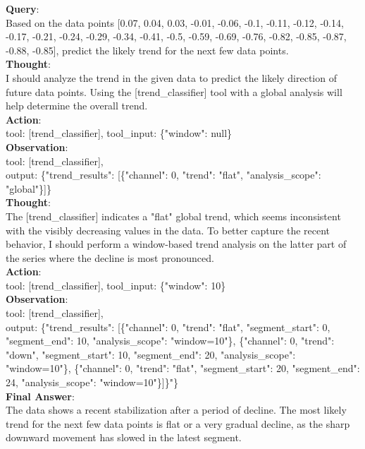 \clearpage
\begin{tcolorbox}[
  colback=white,
  colframe=black!50,
  boxrule=0.3mm,
  width=\textwidth,
  rounded corners,
  title=Sample 4: Trend Prediction,
  fonttitle=\bfseries,
  left=2mm, right=2mm, top=2mm, bottom=2mm
]
\textbf{Query}:\\
Based on the data points [0.07, 0.04, 0.03, -0.01, -0.06, -0.1, -0.11, -0.12, -0.14, -0.17, -0.21, -0.24, -0.29, -0.34, -0.41, -0.5, -0.59, -0.69, -0.76, -0.82, -0.85, -0.87, -0.88, -0.85], predict the likely trend for the next few data points. \\

\textbf{Thought}:\\
I should analyze the trend in the given data to predict the likely direction of future data points. Using the [trend\_classifier] tool with a global analysis will help determine the overall trend.\\

\textbf{Action}:\\
tool: [trend\_classifier], tool\_input: \{"window": null\} \\

\textbf{Observation}: \\
tool: [trend\_classifier], 
\\
output: \{"trend\_results": [\{"channel": 0, "trend": "flat", "analysis\_scope": "global"\}]\} \\

\textbf{Thought}: \\
The [trend\_classifier] indicates a "flat" global trend, which seems inconsistent with the visibly decreasing values in the data. To better capture the recent behavior, I should perform a window-based trend analysis on the latter part of the series where the decline is most pronounced.\\

\textbf{Action}: \\
tool: [trend\_classifier], tool\_input: \{"window": 10\} \\

\textbf{Observation}:\\
tool: [trend\_classifier],\\
output: \{"trend\_results": [\{"channel": 0, "trend": "flat", "segment\_start": 0, "segment\_end": 10, "analysis\_scope": "window=10"\}, \{"channel": 0, "trend": "down", "segment\_start": 10, "segment\_end": 20, "analysis\_scope": "window=10"\}, \{"channel": 0, "trend": "flat", "segment\_start": 20, "segment\_end": 24, "analysis\_scope": "window=10"\}]\}"\}\\

\textbf{Final Answer}:\\
The data shows a recent stabilization after a period of decline. The most likely trend for the next few data points is flat or a very gradual decline, as the sharp downward movement has slowed in the latest segment.
\end{tcolorbox}


